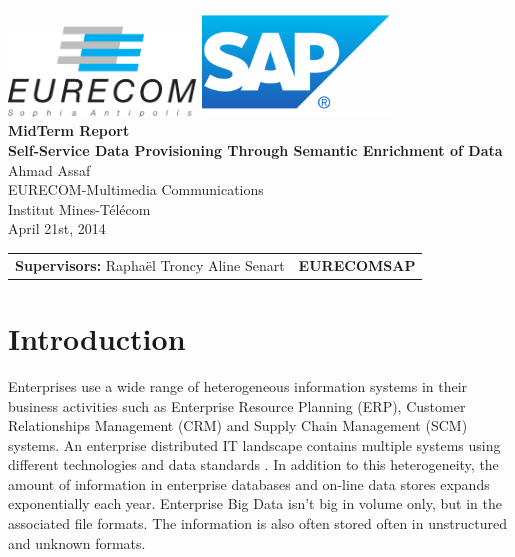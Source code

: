 \documentclass[onecolumn, crcready]{iosart2c}
\begin{document}
\begin{center}
\includegraphics[width=5cm]{EURECOM_logo_quadri}\hspace{5cm}  
\includegraphics[width=5cm]{SAP_logo}
\\[3cm]
\textbf{\Huge{MidTerm Report}}
\\[4cm]
\textbf{\LARGE{Self-Service Data Provisioning Through Semantic Enrichment of Data}}
\\[0.5cm]
\LARGE{Ahmad Assaf}
\\[0.5cm]
\small{EURECOM-Multimedia Communications}
\\
\large{Institut Mines-T\'{e}l\'{e}com}
\\
\large{April 21st, 2014}
\\[5cm]
\begin{tabular}{p{8cm} p{8.5cm}}
\small{\textbf{Supervisors:}\newline
Rapha\"el Troncy \newline Aline Senart} 
&
\small{\textbf{\newline EURECOM\newline SAP}}
\end{tabular}
\end{center}


\section{Introduction}
Enterprises use a wide range of heterogeneous information systems in their business activities such as Enterprise Resource Planning (ERP), Customer Relationships Management (CRM) and Supply Chain Management (SCM) systems. An enterprise distributed IT landscape contains multiple systems using different technologies and data standards \cite{DBLP:conf/semweb/MihindukulasooriyaGG13}. In addition to this heterogeneity, the amount of information in enterprise databases and on-line data stores expands exponentially each year. Enterprise Big Data isn't big in volume only, but in the associated file formats. The information is also often stored often in unstructured and unknown formats.\\
\end{document}
